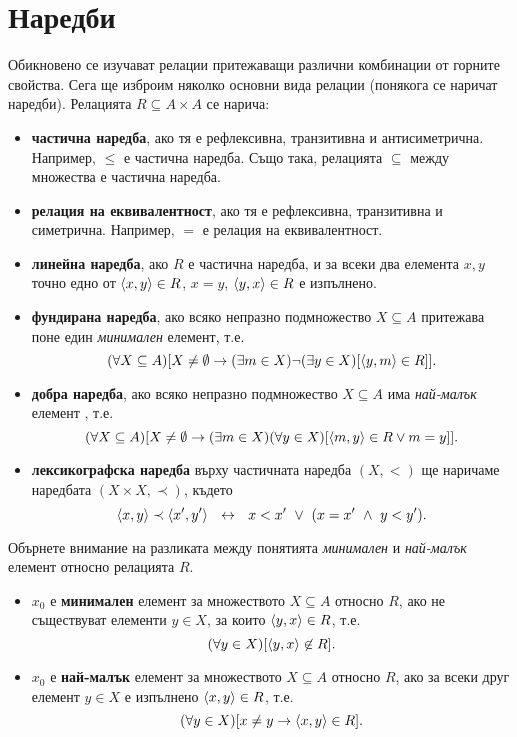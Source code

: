\section{Наредби}
Обикновено се изучават релации притежаващи различни комбинации от горните свойства. 
Сега ще изброим няколко основни вида релации (понякога се наричат наредби).
Релацията $R \subseteq A\times A$ се нарича:
\begin{itemize}
\item
  {\bf частична наредба}, ако тя е рефлексивна, транзитивна и антисиметрична.
  Например, $\leq$ е частична наредба.
  Също така, релацията $\subseteq$ между множества е частична наредба.
\item 
  {\bf релация на еквивалентност}, ако тя е рефлексивна, транзитивна и симетрична.
  Например, $=$ е релация на еквивалентност.
\item
  {\bf линейна наредба}, ако $R$ е частична наредба, 
  и за всеки два елемента $x,y$ точно едно от $\langle{x,y}\rangle \in R$, $x = y$, $\langle{y,x}\rangle\in R$ е изпълнено.
\item
  {\bf фундирана наредба}, 
  ако всяко непразно подмножество $X\subseteq A$ притежава поне един {\em минимален} елемент, т.е.
  \[(\forall X\subseteq A)[X\neq\emptyset \rightarrow (\exists m\in X)\neg(\exists y\in X)[\langle{y,m}\rangle \in R]].\]
\item
  {\bf добра наредба}, ако всяко непразно подмножество $X\subseteq A$ има {\em най-малък} елемент , т.е.
  \[(\forall X\subseteq A)[X\neq\emptyset \rightarrow (\exists m\in X)(\forall y\in X)[\langle{m,y}\rangle\in R \vee m = y]].\]
\item
  {\bf лексикографска наредба} върху частичната наредба $(X,<)$ ще наричаме 
  наредбата $(X\times X,\prec)$, където
  \[\pair{x,y}\prec\pair{x^\prime,y^\prime}\ \iff\ x<x^\prime\ \vee\ (x = x^\prime\ \wedge\ y < y^\prime).\]
\end{itemize}

\begin{remark}
  Обърнете внимание на разликата между понятията {\em минимален} и {\em най-малък} елемент относно релацията $R$.
  \begin{itemize}
  \item $x_0$ е {\bf минимален} елемент за множеството $X \subseteq A$ относно $R$,
    ако не съществуват елементи $y \in X$, за които $\langle{y,x}\rangle\in R$, т.е.
    \[(\forall y \in X)[\langle{y,x}\rangle \not\in R].\]
  \item $x_0$ е {\bf най-малък} елемент за множеството $X \subseteq A$ относно $R$,
    ако за всеки друг елемент $y \in X$ е изпълнено $\langle{x,y}\rangle\in R$, т.е.
    \[(\forall y \in X)[x\neq y \rightarrow \langle{x,y}\rangle \in R].\]
  \end{itemize}
\end{remark}

